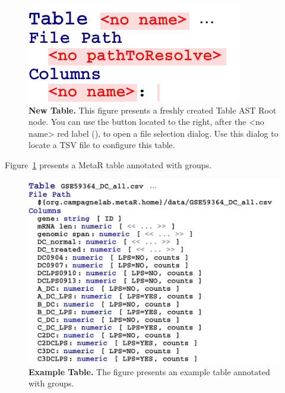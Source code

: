 \begin{figure}
  \includegraphics[width=\figWidthTiny]{figures/NewTable.pdf}
  \caption[New Table.]{\textbf{New Table.} This figure presents a freshly created Table AST Root node. You can use the button located to the right, after the <no name> red label (), to open a file selection dialog. Use this dialog to locate a TSV file to configure this table.}
\end{figure}\label{fig:NewTable}

Figure~\ref{fig:ExampleTable} presents a MetaR table annotated with groups. 

\begin{figure}[h!tbp]
  \centering
  \includegraphics[width=\figWidthWide]{figures/ExampleTable.pdf}
\caption[Example Table.]{\textbf{Example Table.} The figure presents an example table annotated with groups.}
\label{fig:ExampleTable}
\end{figure}


